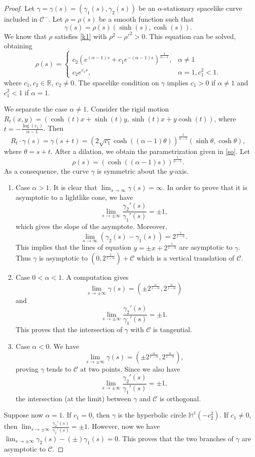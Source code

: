 \documentclass[a4paper,12pt]{amsart}
\theoremstyle{definition}
\def\r{\mathbb R}
\def\h{\mathbb H}
\begin{document}
\begin{proof}
Let $\gamma=\gamma(s)=(\gamma_1(s),\gamma_2(s))$ be an $\alpha$-stationary spacelike curve   included in $\mathcal{C}^-$. Let $\rho=\rho(s)$ be a smooth function such that  
$$\gamma(s)=\rho(s)(\sinh(s), \cosh(s)).$$
We know that $\rho$ satisfies \eqref{k1} with  $\rho^2-\rho'^2>0$. This equation   can be solved,  obtaining
$$\rho(s)= \left\{\begin{array}{ll}
c_2 \left(e^{(\alpha-1)s}+c_1 e^{-(\alpha-1)s}\right)^\frac{1}{\alpha-1},&\alpha\not=1\\
c_2e^{c_1 s},&\alpha=1, c_1^2<1.
\end{array}\right.
$$
where $c_1,c_2\in\r$, $c_2\not=0$. The spacelike condition on $\gamma$ implies  $c_1>0$ if $\alpha\not=1$ and $c_1^2<1$ if $\alpha=1$.  

We separate the case $\alpha\not=1$. Consider the rigid motion $R_t(x,y)= (\cosh(t) x+\sinh(t) y,\sinh(t)x+y\cosh(t))$, where $t=-\frac{\log(c_1)}{\alpha-1}$. Then 
$$R_t\cdot \gamma(s)=\gamma(s+t)=(2\sqrt{c_1}\cosh((\alpha-1)\theta))^\frac{1}{\alpha-1}(\sinh\theta,\cosh\theta),$$
where $\theta=s+t$. After a dilation, we obtain the parametrization given in \eqref{so}. Let 
$$\rho(s)=(\cosh((\alpha-1)s))^\frac{1}{\alpha-1}.$$
As a consequence, the curve $\gamma$ is symmetric about the $y$-axis.
\begin{enumerate}
\item Case $\alpha>1$. It is clear that $\lim_{s\to\infty}\gamma(s)=\infty$. In order to prove that it is asymptotic to a lightlike cone, we have
$$\lim_{s\to\pm\infty}\frac{\gamma_2'(s)}{\gamma_1'(s)}=\pm 1,$$
which gives the slope of the asymptote. Moreover, 
$$\lim_{s\to\infty}(\gamma_2(s)-\gamma_1(s))=2^\frac{1}{1-\alpha}.$$
This implies that the lines of equation $y=\pm  x+2^\frac{1}{1-\alpha}$ are asymptotic to $\gamma$. Thus $\gamma$ is asymptotic to $(0,2^{\frac{1}{1-\alpha}})+\mathcal{C}$ which is a vertical translation of $\mathcal{C}$.
\item Case $0<\alpha<1$. A computation gives 
$$\lim_{s\to\pm\infty}\gamma(s)=(\pm 2^\frac{\alpha}{1-\alpha},2^\frac{\alpha}{1-\alpha})$$
and
$$\lim_{s\to\pm\infty}\frac{\gamma_2'(s)}{\gamma_1'(s)}=\pm 1.$$
This proves that the intersection of $\gamma$ with  $\mathcal{C}$ is tangential.
\item Case $\alpha<0$. We have 
$$\lim_{s\to\pm\infty}\gamma(s)=(\pm 2^\frac{\alpha}{1-\alpha},2^\frac{\alpha}{1-\alpha}),$$
proving $\gamma$ tends to $\mathcal{C}$ at two points. Since we also have
$$\lim_{s\to\pm\infty}\frac{\gamma_2'(s)}{\gamma_1'(s)}=\pm 1,$$
the intersection (at the limit) between $\gamma$ and $\mathcal{C}$ is orthogonal.
\end{enumerate}
Suppose now $\alpha=1$. If $c_1=0$, then   $\gamma$ is the hyperbolic circle $\h^1(-c_2^2)$.  If $c_1\not=0$, then $\lim_{s\to\pm\infty}\frac{\gamma_2'(s)}{\gamma_1'(s)}=\pm 1$. However, now we have $\lim_{s\to\pm\infty}\gamma_2(s)-(\pm)\gamma_1(s)=0$. This proves that the two branches of $\gamma$ are asymptotic to $\mathcal{C}$.

\end{proof}
\end{document}
